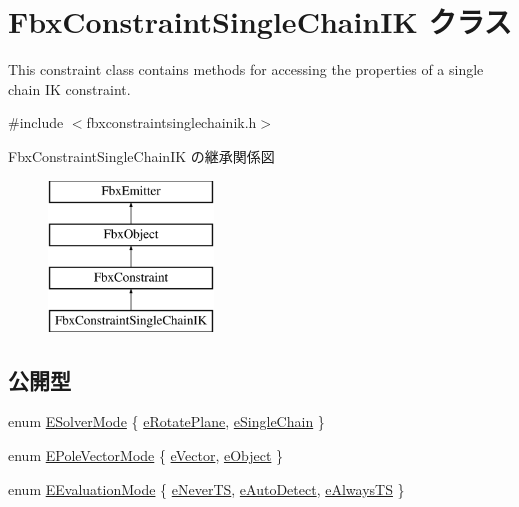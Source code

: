 \hypertarget{class_fbx_constraint_single_chain_i_k}{}\section{Fbx\+Constraint\+Single\+Chain\+IK クラス}
\label{class_fbx_constraint_single_chain_i_k}


This constraint class contains methods for accessing the properties of a single chain IK constraint.  




{\ttfamily \#include $<$fbxconstraintsinglechainik.\+h$>$}

Fbx\+Constraint\+Single\+Chain\+IK の継承関係図\begin{figure}[H]
\begin{center}
\leavevmode
\includegraphics[height=4.000000cm]{class_fbx_constraint_single_chain_i_k}
\end{center}
\end{figure}
\subsection*{公開型}
\begin{DoxyCompactItemize}
\item 
enum \hyperlink{class_fbx_constraint_single_chain_i_k_aac22215f25edcd32ca36e0e4ec0c1d9a}{E\+Solver\+Mode} \{ \hyperlink{class_fbx_constraint_single_chain_i_k_aac22215f25edcd32ca36e0e4ec0c1d9aa50550478223ad7fa82d857c7f5cd8160}{e\+Rotate\+Plane}, 
\hyperlink{class_fbx_constraint_single_chain_i_k_aac22215f25edcd32ca36e0e4ec0c1d9aa1fa1389075eefdd86c267eab6880a7ca}{e\+Single\+Chain}
 \}
\item 
enum \hyperlink{class_fbx_constraint_single_chain_i_k_a853dee195ab92c878a805ed7206a93bb}{E\+Pole\+Vector\+Mode} \{ \hyperlink{class_fbx_constraint_single_chain_i_k_a853dee195ab92c878a805ed7206a93bba1c3f447e03df20c501c61a098e162420}{e\+Vector}, 
\hyperlink{class_fbx_constraint_single_chain_i_k_a853dee195ab92c878a805ed7206a93bbac0d1970fc811997b6248e11efbdf31bc}{e\+Object}
 \}
\item 
enum \hyperlink{class_fbx_constraint_single_chain_i_k_aa730475e0c3f9f1ecc04e61f39369fc1}{E\+Evaluation\+Mode} \{ \hyperlink{class_fbx_constraint_single_chain_i_k_aa730475e0c3f9f1ecc04e61f39369fc1a92ece36c1a7245ce49d98f355ed78c5f}{e\+Never\+TS}, 
\hyperlink{class_fbx_constraint_single_chain_i_k_aa730475e0c3f9f1ecc04e61f39369fc1a2d85bdf9a9c48132894a0b3d35b6c1b2}{e\+Auto\+Detect}, 
\hyperlink{class_fbx_constraint_single_chain_i_k_aa730475e0c3f9f1ecc04e61f39369fc1ab6a348da5218082487a30df63cee3c5d}{e\+Always\+TS}
 \}
\end{DoxyCompactItemize}
